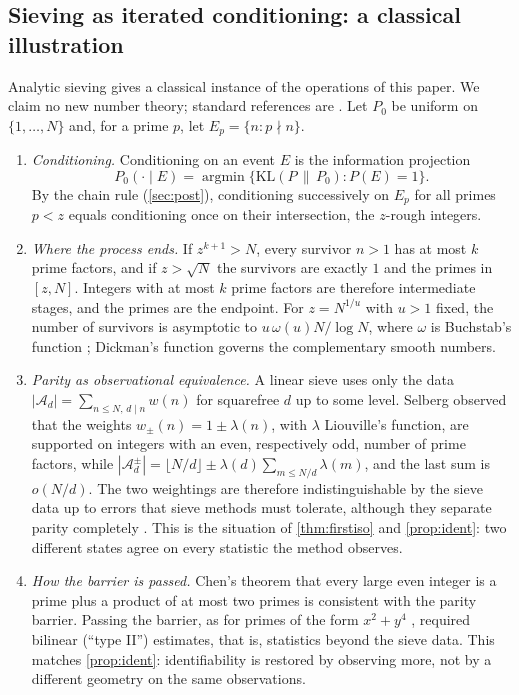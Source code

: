 \documentclass[11pt]{article}
\theoremstyle{definition}
\theoremstyle{remark}
\begin{document}
\subsection{Sieving as iterated conditioning: a classical illustration}\label{sec:sieve}

Analytic sieving gives a classical instance of the operations of this paper. We claim no new number
theory; standard references are \cite{FriedlanderIwaniec2010,Tenenbaum2015}. Let $P_0$ be uniform on
$\{1,\dots,N\}$ and, for a prime $p$, let $E_p=\{n:p\nmid n\}$.

\begin{enumerate}[label=(\alph*),leftmargin=*]
\item \emph{Conditioning.} Conditioning on an event $E$ is the information projection
  \cite{Csiszar1975}
  \[
  P_0(\cdot\mid E)=\operatorname{argmin}\{\mathrm{KL}(P\,\|\,P_0):P(E)=1\}.
  \]
  By the
  chain rule (\cref{sec:post}), conditioning successively on $E_p$ for all primes $p<z$ equals
  conditioning once on their intersection, the $z$-rough integers.
\item \emph{Where the process ends.} If $z^{k+1}>N$, every survivor $n>1$ has at most $k$ prime
  factors, and if $z>\sqrt N$ the survivors are exactly $1$ and the primes in $[z,N]$. Integers with at
  most $k$ prime factors are therefore intermediate stages, and the primes are the endpoint. For
  $z=N^{1/u}$ with $u>1$ fixed, the number of survivors is asymptotic to $u\,\omega(u)N/\log N$, where
  $\omega$ is Buchstab's function \cite[III.6]{Tenenbaum2015}; Dickman's function governs the
  complementary smooth numbers.
\item \emph{Parity as observational equivalence.} A linear sieve uses only the data
  $|\mathcal{A}_d|=\sum_{n\le N,\,d\mid n}w(n)$ for squarefree $d$ up to some level. Selberg observed
  that the weights $w_\pm(n)=1\pm\lambda(n)$, with $\lambda$ Liouville's function, are supported on
  integers with an even, respectively odd, number of prime factors, while
  $|\mathcal{A}^\pm_d|=\lfloor N/d\rfloor\pm\lambda(d)\sum_{m\le N/d}\lambda(m)$, and the last sum is
  $o(N/d)$. The two weightings are therefore indistinguishable by the sieve data up to errors that
  sieve methods must tolerate, although they separate parity completely
  \cite[Ch.~16]{FriedlanderIwaniec2010}. This is the situation of \cref{thm:firstiso} and
  \cref{prop:ident}: two different states agree on every statistic the method observes.
\item \emph{How the barrier is passed.} Chen's theorem that every large even integer is a prime plus
  a product of at most two primes \cite{Chen1973} is consistent with the parity barrier. Passing the
  barrier, as for primes of the form $x^2+y^4$ \cite{FriedlanderIwaniec1998}, required bilinear
  (``type II'') estimates, that is, statistics beyond the sieve data. This matches
  \cref{prop:ident}: identifiability is restored by observing more, not by a different geometry on the
  same observations.
\end{enumerate}
\end{document}
